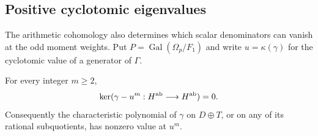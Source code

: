 \subsection{Positive cyclotomic eigenvalues}
\label{subsec:positive-eigenvalues}

The arithmetic cohomology also determines which scalar
denominators can vanish at the odd moment weights.
Put $P=\operatorname{Gal}(\Omega_p/F_1)$ and write
$u=\kappa(\gamma)$ for the cyclotomic value of a generator
of $\Gamma$.

\begin{lemma}\label{lem:positive-eigenvalues}
For every integer $m\geq2$,
\[
 \ker(\gamma-u^m:H^{\rm ab}\longrightarrow H^{\rm ab})=0.
\]
Consequently the characteristic polynomial of $\gamma$
on $D\oplus T$, or on any of its rational subquotients,
has nonzero value at $u^m$.
\end{lemma}
